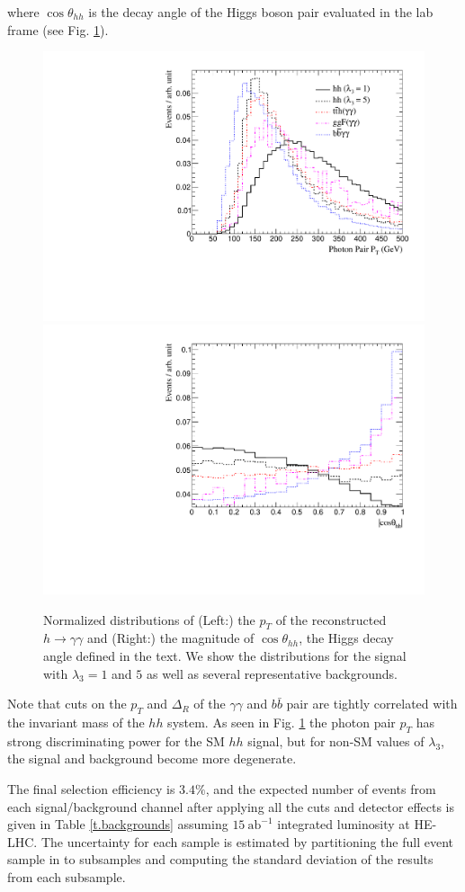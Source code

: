 where $\cos\theta_{hh}$ is the decay angle of the Higgs boson pair evaluated in the lab frame (see Fig. \ref{fig:kinematics}).

\begin{figure}[ht]
\centering
	\includegraphics[width=0.49\linewidth]{section3/plots/DiphotonPT}%
\hfill
	\includegraphics[width=0.49\linewidth]{section3/plots/higgs_decayangle}%
\caption{Normalized distributions of (Left:) the $p_T$ of the reconstructed $h\rightarrow\gamma\gamma$ and (Right:) the magnitude of $\cos\theta_{hh}$, the Higgs decay angle defined in the text. We show the distributions for the signal with $\lambda_{3} = 1$ and $5$ as well as several representative backgrounds.}
\label{fig:kinematics}
\end{figure}

Note that cuts on the $p_T$ and $\Delta_R$ of the $\gamma\gamma$ and $b\bar{b}$ pair are tightly correlated with the invariant mass of the $hh$ system. As seen in Fig. \ref{fig:kinematics} the photon pair $p_T$ has strong discriminating power for the SM $hh$ signal, but for non-SM values of $\lambda_{3}$, the signal and background become more degenerate.

The final selection efficiency is $3.4 \%$, and the expected number of events from each signal/background channel after applying all the cuts and detector effects is given in Table \ref{t.backgrounds} assuming $15~\text{ab}^{-1}$ integrated luminosity at HE-LHC. The uncertainty for each sample is estimated by partitioning the full event sample in to subsamples and computing the standard deviation of the results from each subsample.

